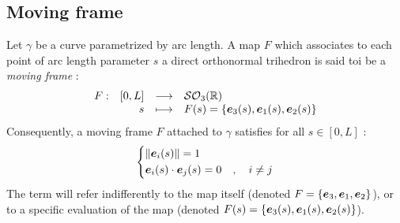 \subsection{Moving frame}

Let $\gamma$ be a curve parametrized by arc length. A map $F$ which associates to each point of arc length parameter $s$ a direct orthonormal trihedron is said toi be a \emph{moving frame} :
\begin{equation}
	\begin{array}{lrcl} F: & [0,L] & \longrightarrow & \mathcal{SO}_{3}(\mathbb{R}) \\ & s & \longmapsto & F(s) = \{\boldsymbol{e}_{3}(s),\boldsymbol{e}_{1}(s),\boldsymbol{e}_{2}(s)\} \end{array}
\end{equation}
Consequently, a moving frame $F$ attached to $\gamma$ satisfies for all $s \in [0,L]$ :
\begin{equation}
	\left\{
	\begin{aligned}
		& \lVert\boldsymbol{e}_i(s)\rVert = 1 \\
		& \boldsymbol{e}_i(s) \cdot \boldsymbol{e}_j(s) = 0\quad , \quad i \neq j
	\end{aligned}
	\right.
\end{equation}
The term  will refer indifferently to the map itself (denoted $F=\{\boldsymbol{e}_{3},\boldsymbol{e}_{1},\boldsymbol{e}_{2}\}$), or to a specific evaluation of the map (denoted $F(s)=\{\boldsymbol{e}_{3}(s),\boldsymbol{e}_{1}(s),\boldsymbol{e}_{2}(s)\}$).

